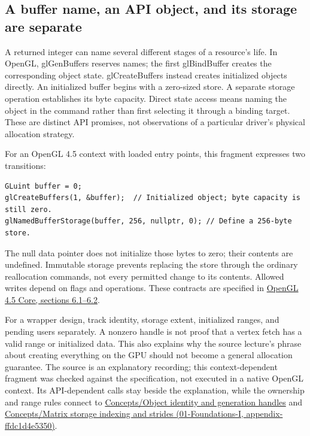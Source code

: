\subsection{A buffer name, an API object, and its storage are separate}\label{05-engine-i-ch008-a-buffer-name-an-api-object-and-its-storage-are-separate}

A returned integer can name several different stages of a resource's life. In OpenGL, glGenBuffers reserves names; the first glBindBuffer creates the corresponding object state. glCreateBuffers instead creates initialized objects directly. An initialized buffer begins with a zero-sized store. A separate storage operation establishes its byte capacity. Direct state access means naming the object in the command rather than first selecting it through a binding target. These are distinct API promises, not observations of a particular driver's physical allocation strategy.

For an OpenGL 4.5 context with loaded entry points, this fragment expresses two transitions:

\begin{verbatim}
GLuint buffer = 0;
glCreateBuffers(1, &buffer);  // Initialized object; byte capacity is still zero.
glNamedBufferStorage(buffer, 256, nullptr, 0); // Define a 256-byte store.
\end{verbatim}

The null data pointer does not initialize those bytes to zero; their contents are undefined. Immutable storage prevents replacing the store through the ordinary reallocation commands, not every permitted change to its contents. Allowed writes depend on flags and operations. These contracts are specified in \href{https://registry.khronos.org/OpenGL/specs/gl/glspec45.core.pdf}{OpenGL 4.5 Core, sections 6.1--6.2}.

For a wrapper design, track identity, storage extent, initialized ranges, and pending users separately. A nonzero handle is not proof that a vertex fetch has a valid range or initialized data. This also explains why the source lecture's phrase about creating everything on the GPU should not become a general allocation guarantee. The source is an explanatory recording; this context-dependent fragment was checked against the specification, not executed in a native OpenGL context. Its API-dependent calls stay beside the explanation, while the ownership and range rules connect to \hyperref[appendix-f1581457d322]{Concepts/Object identity and generation handles} and \href{../01-Foundations-I/main.pdf\#nameddest=appendix-ffdc1d4e5350}{Concepts/Matrix storage indexing and strides (01-Foundations-I, appendix-ffdc1d4e5350)}.


